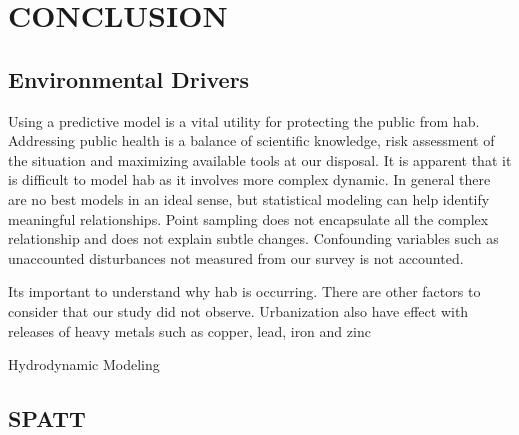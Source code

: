 \chapter{CONCLUSION}

\section{Environmental Drivers}

Using a predictive model is a vital utility for protecting the public from \gls{hab}. Addressing public health is a balance of scientific knowledge, risk assessment of the situation and maximizing available tools at our disposal. It is apparent that it is difficult to model \gls{hab} as it involves more complex dynamic. In general there are no best models in an ideal sense, but statistical modeling can help identify meaningful relationships. Point sampling does not encapsulate all the complex relationship and does not explain subtle changes. Confounding variables such as unaccounted disturbances not measured from our survey is not accounted.

Its important to understand why \gls{hab} is occurring. There are other factors to consider that our study did not observe. Urbanization also have effect with releases of heavy metals such as copper, lead, iron and zinc \cite{clausen_introduction_2018}


Hydrodynamic Modeling

\section{SPATT}

